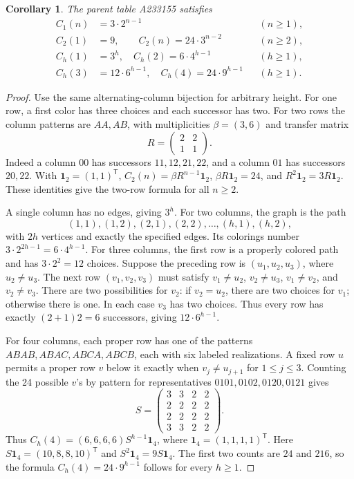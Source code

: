 \documentclass[11pt,a4paper]{article}
\newtheorem{corollary}[theorem]{Corollary}
\newcommand{\ones}{\boldsymbol{1}}
\newcommand{\counts}{C}
\begin{document}
\begin{corollary}\label{cor:thin}
The parent table A233155 satisfies
\begin{align*}
 \counts_1(n)&=3\cdot2^{n-1} &&(n\ge1),\\
 \counts_2(1)&=9,\qquad
 \counts_2(n)=24\cdot3^{n-2} &&(n\ge2),\\
 \counts_h(1)&=3^h,\quad
 \counts_h(2)=6\cdot4^{h-1} &&(h\ge1),\\
 \counts_h(3)&=12\cdot6^{h-1},\quad
 \counts_h(4)=24\cdot9^{h-1} &&(h\ge1).
\end{align*}
\end{corollary}
\begin{proof}
Use the same alternating-column bijection for arbitrary height.
For one row, a first color has three choices and each successor has two.
For two rows the column patterns are \(AA,AB\), with multiplicities
\(\beta=(3,6)\) and transfer matrix
\[
 R=\begin{pmatrix}2&2\\1&1\end{pmatrix}.
\]
Indeed a column \(00\) has successors \(11,12,21,22\), and a column
\(01\) has successors \(20,22\). With \(\ones_2=(1,1)^{\mathsf T}\),
\(\counts_2(n)=\beta R^{n-1}\ones_2\),
\(\beta R\ones_2=24\), and \(R^2\ones_2=3R\ones_2\).
These identities give the two-row formula for all \(n\ge2\).

A single column has no edges, giving \(3^h\).
For two columns, the graph is the path
\[
 (1,1),(1,2),(2,1),(2,2),\ldots,(h,1),(h,2),
\]
with \(2h\) vertices and exactly the specified edges. Its colorings number
\(3\cdot2^{2h-1}=6\cdot4^{h-1}\).
For three columns, the first row is a properly colored path and has
\(3\cdot2^2=12\) choices. Suppose the preceding row is
\((u_1,u_2,u_3)\), where \(u_2\ne u_3\).
The next row \((v_1,v_2,v_3)\) must satisfy
\(v_1\ne u_2\), \(v_2\ne u_3\), \(v_1\ne v_2\), and \(v_2\ne v_3\).
There are two possibilities for \(v_2\): if \(v_2=u_2\), there are
two choices for \(v_1\); otherwise there is one. In each case \(v_3\)
has two choices. Thus every row has exactly \((2+1)2=6\) successors,
giving \(12\cdot6^{h-1}\).

For four columns, each proper row has one of the patterns
\(ABAB,ABAC,ABCA,ABCB\), each with six labeled realizations.
A fixed row \(u\) permits a proper row \(v\) below it exactly when
\(v_j\ne u_{j+1}\) for \(1\le j\le3\).
Counting the 24 possible \(v\)'s by pattern for representatives
\(0101,0102,0120,0121\) gives
\[
 S=\begin{pmatrix}3&3&2&2\\2&2&2&2\\2&2&2&2\\3&3&2&2\end{pmatrix}.
\]
Thus \(\counts_h(4)=(6,6,6,6)S^{h-1}\ones_4\), where
\(\ones_4=(1,1,1,1)^{\mathsf T}\).
Here \(S\ones_4=(10,8,8,10)^{\mathsf T}\) and
\(S^2\ones_4=9S\ones_4\).
The first two counts are \(24\) and \(216\), so the formula
\(\counts_h(4)=24\cdot9^{h-1}\) follows for every \(h\ge1\).
\end{proof}
\end{document}
